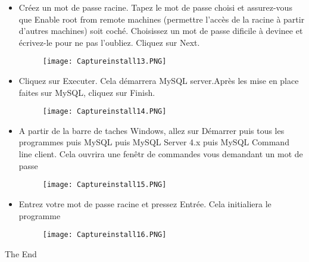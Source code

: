 \documentclass{beamer}
\begin{document}
  \begin{frame}
\begin{itemize}
    
     \item Créez un mot de passe racine. Tapez le mot de passe choisi et assurez-vous que Enable root from remote machines (permettre l'accès de la racine \`a partir d'autres machines) soit coch\'e. Choisissez un mot de passe dificile à devinee et \'ecrivez-le pour ne pas l'oubliez. Cliquez sur Next.
           \begin{figure}[h]
\centering	
 \texttt{[image: Captureinstall13.PNG]}
\end{figure}
     \end{itemize}
     
 \end{frame}
  \begin{frame}
\begin{itemize}
    
     \item Cliquez sur Executer. Cela d\'emarrera MySQL server.Après les mise en place faites sur MySQL, cliquez sur Finish.
           \begin{figure}[h]
\centering	
 \texttt{[image: Captureinstall14.PNG]}
\end{figure}
     \end{itemize}
     
 \end{frame}
  \begin{frame}
\begin{itemize}
    
     \item A partir de la barre de taches Windows, allez sur Démarrer puis tous les programmes puis MySQL puis MySQL Server 4.x puis MySQL Command line client. Cela ouvrira une fen\^etr de commandes vous demandant un mot de passe
           \begin{figure}[h]
\centering	
 \texttt{[image: Captureinstall15.PNG]}
\end{figure}
     \end{itemize}
     
 \end{frame}
  \begin{frame}
\begin{itemize}
    
     \item Entrez votre mot de passe racine et pressez Entr\'ee. Cela initialiera le programme
           \begin{figure}[h]
\centering	
 \texttt{[image: Captureinstall16.PNG]}
\end{figure}
     \end{itemize}
     
 \end{frame}
\begin{frame}
\Huge{\centerline{The End}}
\end{frame}
\end{document}
